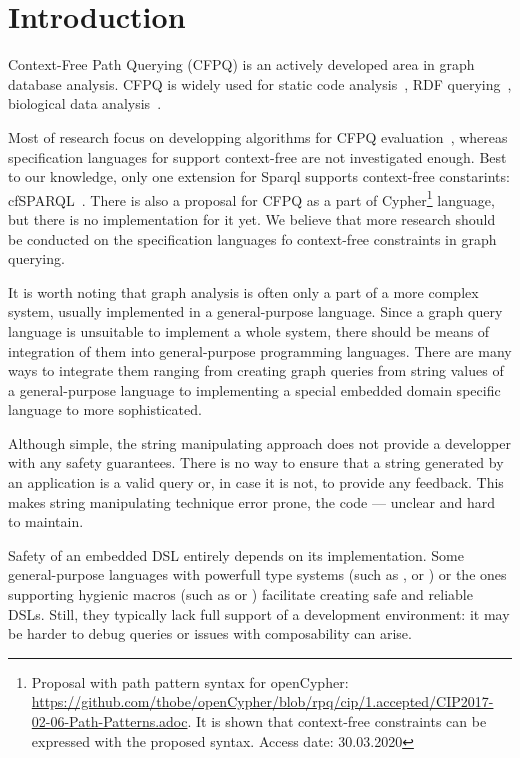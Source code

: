 \section{Introduction}

Context-Free Path Querying (CFPQ) is an actively developed area in graph database analysis.
CFPQ is widely used for static code analysis~\cite{Reps,10.1145/193173.195287,Zheng}, RDF querying~\cite{10.1007/978-3-319-46523-4_38,MEDEIROS201975}, biological data analysis~\cite{cfpqBio}.

Most of research focus on developping algorithms for CFPQ evaluation~\cite{hellingsRelational,ward2008distributed,cfpqBio,MEDEIROS201975,Azimov:2018:CPQ:3210259.3210264,Grigorev:2017:CPQ:3166094.3166104}, whereas specification languages for support context-free are not investigated enough.
Best to our knowledge, only one extension for Sparql supports context-free constarints: cfSPARQL~\cite{10.1007/978-3-319-46523-4_38}.
There is also a proposal for CFPQ as a part of Cypher\footnote{Proposal with path pattern syntax for openCypher: \url{https://github.com/thobe/openCypher/blob/rpq/cip/1.accepted/CIP2017-02-06-Path-Patterns.adoc}. It is shown that context-free constraints can be expressed with the proposed syntax. Access date: 30.03.2020} language, but there is no implementation for it yet.
We believe that more research should be conducted on the specification languages fo context-free constraints in graph querying.

It is worth noting that graph analysis is often only a part of a more complex system, usually implemented in a general-purpose language. 
Since a graph query language is unsuitable to implement a whole system, there should be means of integration of them into general-purpose programming languages.
There are many ways to integrate them ranging from creating graph queries from string values of a general-purpose language to implementing a special embedded domain specific language to more sophisticated.

Although simple, the string manipulating approach does not provide a developper with any safety guarantees.
There is no way to ensure that a string generated by an application is a valid query or, in case it is not, to provide any feedback.
This makes string manipulating technique error prone, the code --- unclear and hard to maintain.

Safety of an embedded DSL entirely depends on its implementation. 
Some general-purpose languages with powerfull type systems (such as \haskell{}, \ocaml{} or \scala{}) or the ones supporting hygienic macros (such as \scheme{} or \rust{}) facilitate creating safe and reliable DSLs. 
Still, they typically lack full support of a development environment: it may be harder to debug queries or issues with composability can arise.

